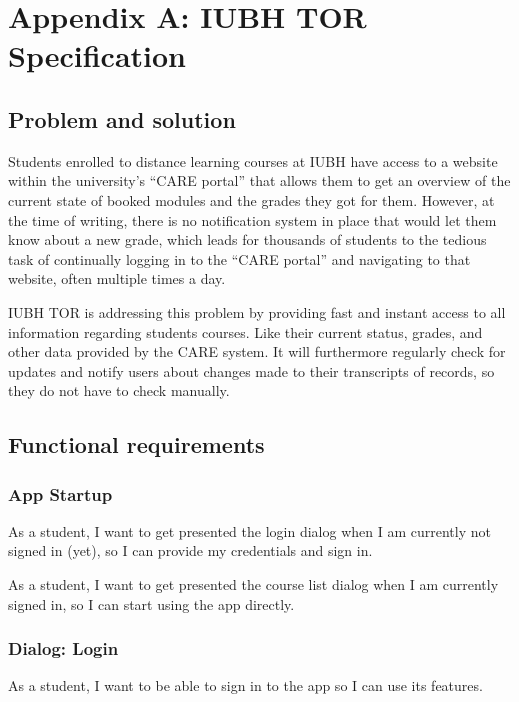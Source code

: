 \section*{Appendix A: IUBH TOR Specification}
\subsection*{Problem and solution}

Students enrolled to distance learning courses at IUBH have access to a website within the university’s “CARE portal” that allows them to get an overview of the current state of booked modules and the grades they got for them. However, at the time of writing, there is no notification system in place that would let them know about a new grade, which leads for thousands of students to the tedious task of continually logging in to the “CARE portal” and navigating to that website, often multiple times a day. 

IUBH TOR is addressing this problem by providing fast and instant access to all information regarding students courses. Like their current status, grades, and other data provided by the CARE system. It will furthermore regularly check for updates and notify users about changes made to their transcripts of records, so they do not have to check manually.

\subsection*{Functional requirements}

\subsubsection*{App Startup}

As a student, I want to get presented the login dialog when I am currently not signed in (yet), so I can provide my credentials and sign in.

As a student, I want to get presented the course list dialog when I am currently signed in, so I can start using the app directly.

\subsubsection*{Dialog: Login}

As a student, I want to be able to sign in to the app so I can use its features.

